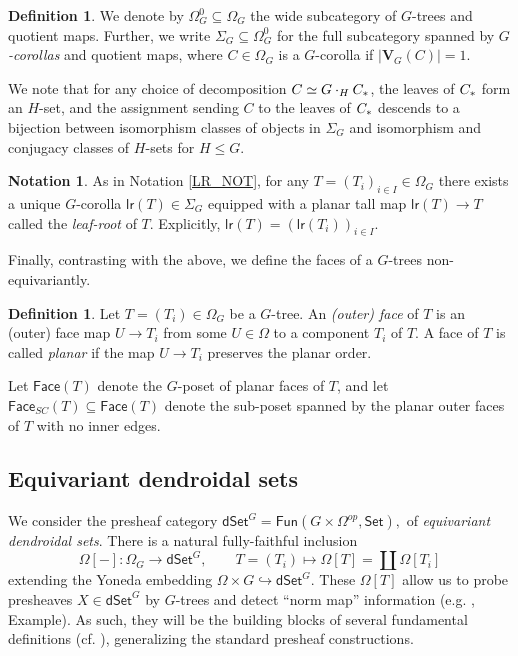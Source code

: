 \documentclass[a4paper,10pt
,draft
]{article}%
\numberwithin{equation}{section}
\numberwithin{figure}{section}
\theoremstyle{definition} %
\newtheorem{definition}[equation]{Definition}%
\newtheorem{notation}[equation]{Notation}%
\newcommand{\longto}{\longrightarrow}%
\newcommand{\into}{\hookrightarrow}%
\newcommand{\Set}{\ensuremath{\mathsf{Set}}}
\newcommand{\dSet}{\mathsf{dSet}}
\newcommand{\Fun}{\mathsf{Fun}}
\newcommand{\1}{\ensuremath{\mathbbm 1}}%
\begin{document}
\begin{definition}
      We denote by $\Omega_G^0 \subseteq \Omega_G$ the wide subcategory of $G$-trees and quotient maps.
      Further, we write $\Sigma_G \subseteq \Omega_G^0$ for the full subcategory spanned by \textit{$G$-corollas} and quotient maps,
      where $C \in \Omega_G$ is a $G$-corolla if $|\boldsymbol{V}_G(C)| = 1$.

      We note that for any choice of decomposition $C \simeq G \cdot_H C_{\**}$, the leaves of $C_{\**}$ form an $H$-set,
      and the assignment sending $C$ to the leaves of $C_{\**}$ descends to a bijection between
      isomorphism classes of objects in $\Sigma_G$ and
      isomorphism and conjugacy classes of $H$-sets for $H \leq G$.
\end{definition}
      
\begin{notation}
      \label{LRG_NOT}
      As in Notation \ref{LR_NOT}, 
      for any $T = (T_i)_{i \in I} \in \Omega_G$ there exists a unique $G$-corolla $\mathsf{lr}(T) \in \Sigma_G$ equipped with a planar tall map $\mathsf{lr}(T) \to T$
      called the \textit{leaf-root} of $T$.
      Explicitly, $\mathsf{lr}(T) = (\mathsf{lr}(T_i))_{i \in I}$.
\end{notation}

Finally, contrasting with the above, we define the faces of a $G$-trees non-equivariantly.
\begin{definition}
      Let $T = (T_i) \in \Omega_G$ be a $G$-tree.
      An \textit{(outer) face} of $T$ is an (outer) face map $U \to T_i$ from some $U \in \Omega$ to a component $T_i$ of $T$.
      A face of $T$ is called \textit{planar} if the map $U \to T_i$ preserves the planar order.

      Let $\mathsf{Face}(T)$ denote the $G$-poset of planar faces of $T$,
      and let $\mathsf{Face}_{SC}(T) \subseteq \mathsf{Face}(T)$ denote the sub-poset spanned by the planar outer faces of $T$ with no inner edges.
\end{definition}



\subsection{Equivariant dendroidal sets}
\label{EDS_SEC}

We consider the presheaf category 
$
\dSet^G = \Fun(G \times \Omega^{op}, \Set),
$
of \textit{equivariant dendroidal sets}.
There is a natural fully-faithful inclusion
\[
      \Omega[-] \colon \Omega_G \longto \dSet^G,
      \qquad
      T = (T_i) \longmapsto \Omega[T] = \coprod \Omega[T_i]
\]
extending the Yoneda embedding $\Omega \times G \into \dSet^G$.
These $\Omega[T]$ allow us to probe presheaves $X \in \dSet^G$ by $G$-trees and detect ``norm map'' information 
(e.g. \cite[Example 4.9]{Per18}, {\color{blue} Example}).
As such, they will be the building blocks of several fundamental definitions (cf. \cite[\S 6]{Per18}), generalizing the standard presheaf constructions.
\end{document}
